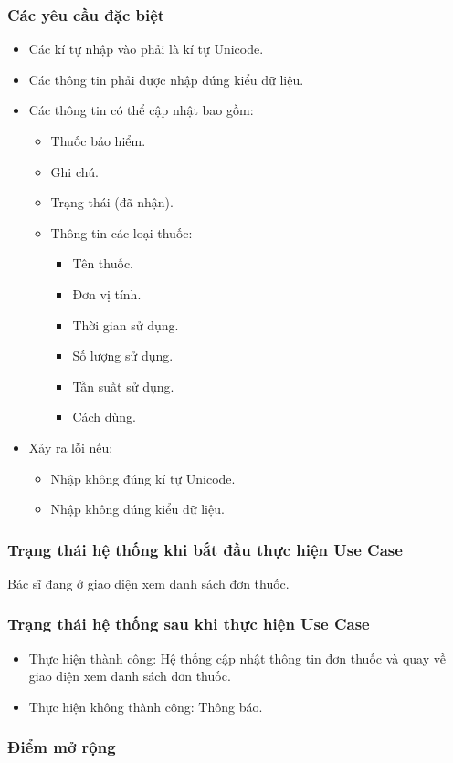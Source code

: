 \subsubsection{Các yêu cầu đặc biệt}
\begin{itemize}
  \item Các kí tự nhập vào phải là kí tự Unicode.
  \item Các thông tin phải được nhập đúng kiểu dữ liệu.
  \item Các thông tin có thể cập nhật bao gồm:
    \begin{itemize}
      \item Thuốc bảo hiểm.
      \item Ghi chú.
      \item Trạng thái (đã nhận).
      \item Thông tin các loại thuốc:
      \begin{itemize}
        \item Tên thuốc.
        \item Đơn vị tính.
        \item Thời gian sử dụng.
        \item Số lượng sử dụng.
        \item Tần suất sử dụng.
        \item Cách dùng.
      \end{itemize}
    \end{itemize}
  \item Xảy ra lỗi nếu:
    \begin{itemize}
      \item Nhập không đúng kí tự Unicode.
      \item Nhập không đúng kiểu dữ liệu.
    \end{itemize}
\end{itemize}

\subsubsection{Trạng thái hệ thống khi bắt đầu thực hiện Use Case}
Bác sĩ đang ở giao diện xem danh sách đơn thuốc.

\subsubsection{Trạng thái hệ thống sau khi thực hiện Use Case}
\begin{itemize}
  \item Thực hiện thành công: Hệ thống cập nhật thông tin đơn thuốc và quay về giao diện xem danh sách đơn thuốc.
  \item Thực hiện không thành công: Thông báo.
\end{itemize}

\subsubsection{Điểm mở rộng}